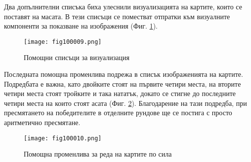 Два допълнителни списъка биха улеснили визуализацията на картите, които се поставят на масата. В тези списъци се поместват отпратки към визуалните компоненти за показване на изображения (Фиг. \ref{fig100009}).

\begin{figure}[H]
  \centering
  \texttt{[image: fig100009.png]}
  \caption{Помощни списъци за визуализация}
\label{fig100009}
\end{figure}

Последната помощна променлива подрежа в списък изображенията на картите. Подредбата е важна, като двойките стоят на първите четири места, на вторите четири места стоят тройките и така нататък, докато се стигне до последните четири места на които стоят асата (Фиг. \ref{fig100010}). Благодарение на тази подредба, при пресмятането на победителите в отделните рундове ще се постига с просто аритметично пресмятане. 

\begin{figure}[H]
  \centering
  \texttt{[image: fig100010.png]}
  \caption{Помощна променлива за реда на картите по сила}
\label{fig100010}
\end{figure}

